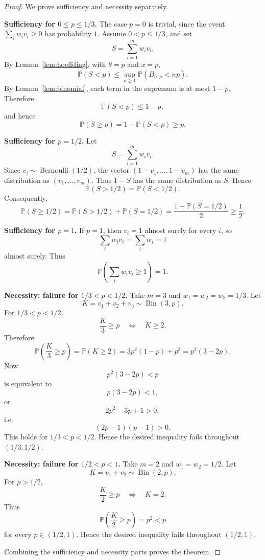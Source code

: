 \documentclass[12pt]{article}
\DeclareMathOperator{\Bin}{Bin}
\begin{document}
\begin{proof}
We prove sufficiency and necessity separately.

\medskip

\noindent\textbf{Sufficiency for \(0\le p\le 1/3\).}
The case \(p=0\) is trivial, since the event
\(\sum_i w_i v_i\ge0\) has probability \(1\). Assume \(0<p\le1/3\), and set
\[
S=\sum_{i=1}^m w_i v_i .
\]
By Lemma~\ref{lem:hoeffding}, with \(\theta=p\) and \(x=p\),
\[
\mathbb P(S<p)
\le
\sup_{n\ge1}\mathbb P(B_{n,p}<np).
\]
By Lemma~\ref{lem:binomial}, each term in the supremum is at most \(1-p\).
Therefore
\[
\mathbb P(S<p)\le 1-p,
\]
and hence
\[
\mathbb P(S\ge p)=1-\mathbb P(S<p)\ge p.
\]

\medskip

\noindent\textbf{Sufficiency for \(p=1/2\).}
Let
\[
S=\sum_{i=1}^m w_i v_i .
\]
Since \(v_i\sim\operatorname{Bernoulli}(1/2)\), the vector
\((1-v_1,\ldots,1-v_m)\) has the same distribution as
\((v_1,\ldots,v_m)\). Thus \(1-S\) has the same distribution as \(S\). Hence
\[
\mathbb P(S>1/2)=\mathbb P(S<1/2).
\]
Consequently,
\[
\mathbb P(S\ge1/2)
=
\mathbb P(S>1/2)+\mathbb P(S=1/2)
=
\frac{1+\mathbb P(S=1/2)}2
\ge \frac12.
\]

\medskip

\noindent\textbf{Sufficiency for \(p=1\).}
If \(p=1\), then \(v_i=1\) almost surely for every \(i\), so
\[
\sum_i w_i v_i=\sum_i w_i=1
\]
almost surely. Thus
\[
\mathbb P\!\left(\sum_i w_i v_i\ge1\right)=1.
\]

\medskip

\noindent\textbf{Necessity: failure for \(1/3<p<1/2\).}
Take \(m=3\) and \(w_1=w_2=w_3=1/3\). Let
\[
K=v_1+v_2+v_3\sim \Bin(3,p).
\]
For \(1/3<p<1/2\),
\[
\frac K3\ge p
\quad\Longleftrightarrow\quad
K\ge2.
\]
Therefore
\[
\mathbb P\!\left(\frac K3\ge p\right)
=
\mathbb P(K\ge2)
=
3p^2(1-p)+p^3
=
p^2(3-2p).
\]
Now
\[
p^2(3-2p)<p
\]
is equivalent to
\[
p(3-2p)<1,
\]
or
\[
2p^2-3p+1>0,
\]
i.e.
\[
(2p-1)(p-1)>0.
\]
This holds for \(1/3<p<1/2\). Hence the desired inequality fails throughout
\((1/3,1/2)\).

\medskip

\noindent\textbf{Necessity: failure for \(1/2<p<1\).}
Take \(m=2\) and \(w_1=w_2=1/2\). Let
\[
K=v_1+v_2\sim \Bin(2,p).
\]
For \(p>1/2\),
\[
\frac K2\ge p
\quad\Longleftrightarrow\quad
K=2.
\]
Thus
\[
\mathbb P\!\left(\frac K2\ge p\right)=p^2<p
\]
for every \(p\in(1/2,1)\). Hence the desired inequality fails throughout
\((1/2,1)\).

Combining the sufficiency and necessity parts proves the theorem.
\end{proof}
\end{document}
